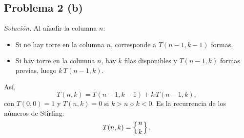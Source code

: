 \subsection*{Problema 2 (b)}
\emph{Solución.}
Al añadir la columna \(n\):
\begin{itemize}
\item Si no hay torre en la columna \(n\), corresponde a \(T(n-1,k-1)\) formas.
\item Si hay torre en la columna \(n\), hay \(k\) filas disponibles y \(T(n-1,k)\) formas previas, luego \(k\,T(n-1,k)\).
\end{itemize}
Así,
\[
T(n,k) = T(n-1,k-1) + k\,T(n-1,k),
\]
con \(T(0,0)=1\) y \(T(n,k)=0\) si \(k>n\) o \(k<0\). Es la recurrencia de los números de Stirling:
\[
T(n,k)=\left\{n\atop k\right\}.
\]
